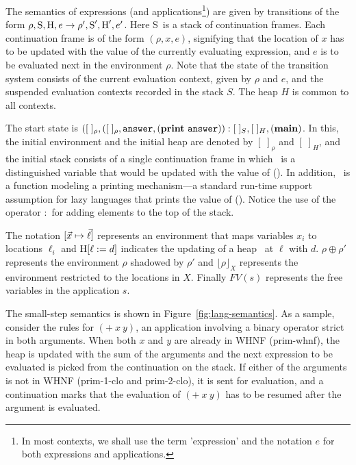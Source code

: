 \documentclass[9pt]{sigplanconf}
\def\myvec{\mathaccent"017E }
\newcommand{\stk}{\mbox{S}}
\begin{document}
The  semantics  of   expressions  (and  applications\footnote{In  most
  contexts, we  shall use the  term 'expression' and the  notation $e$
  for both expressions and applications.}) are given by transitions of
the form $\rho, \stk, \heap,  e \rightarrow \rho', \stk', \heap', e'$.
Here \stk\ is a stack of continuation frames.  Each continuation frame
is of the form $(\rho, x, e)$, signifying that the location of $x$ has
to be updated  with the value of the  currently evaluating expression,
and $e$ is to be evaluated  next in the environment $\rho$.  Note that
the state of the transition  system consists of the current evaluation
context,  given  by  $\rho$  and $e$,  and  the  suspended  evaluation
contexts recorded  in the stack  $S$.  The heap  $H$ is common  to all
contexts.


The     start      state     is      $([\;]_\rho,([\;]_\rho,     \mathbf{\mbox{\tt answer}},
(\mathbf{print}~\mathbf{\mbox{\tt answer}})):[\;]_{S} , [\;]_{H}, (\mathbf{main})$.  In this, the initial
environment  and  the initial  heap  are  denoted by  $[\;]_\rho$  and
$[\;]_H$,  and the  initial stack  consists of  a single  continuation
frame in which \ans\ is a distinguished variable that would be updated
with  the value  of (\mainpgm).   In addition,  \print\ is  a function
modeling a printing mechanism---a standard run-time support assumption
for lazy  languages that prints  the value of (\mainpgm).   Notice the
use of the operator $:$ for adding elements to the top of the stack.



The notation  $[\myvec{x}   \mapsto  \myvec{\ell}]$   represents  an
environment that maps variables $x_i$
to locations $\ell_i$
and  $\mbox{H}[\ell :=  d]$
indicates the  updating of  a heap \heap\  at $\ell$ with  $d$.  $\rho
\oplus \rho'$  represents the  environment $\rho$ shadowed  by $\rho'$
and $\lfloor \rho \rfloor_X$  represents the environment restricted to
the locations in $X$. Finally $FV(s)$ represents the free variables in
the application $s$.

The small-step semantics  is shown in Figure~\ref{fig:lang-semantics}.
As  a sample,  consider  the  rules  for  $(+~x~y)$, an  application
involving a binary operator strict in both arguments.   When
both $x$  and $y$ are already  in WHNF ({\sc prim-whnf}),  the heap is
updated with the  sum of the arguments and  the next expression to be
evaluated is picked from the continuation on the stack. If either of the
arguments is not in
WHNF  ({\sc  prim-1-clo}  and   {\sc  prim-2-clo}),  it  is  sent  for
evaluation, and a continuation  marks that the evaluation of $(+~x~y)$
has to be resumed after the argument is evaluated.
\end{document}
